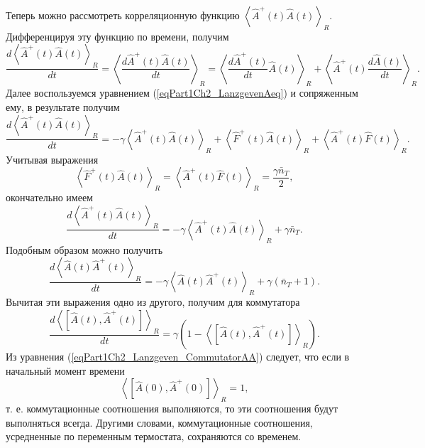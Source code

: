 Теперь можно рассмотреть корреляционную функцию 
\(
\left<\hat{A}^{+}\left(t\right)\hat{A}\left(t\right)\right>_R
\). Дифференцируя эту функцию по времени, получим
\begin{equation}
\frac{d \left<\hat{A}^{+}\left(t\right)\hat{A}\left(t\right)\right>_R}{d
t}=
\left<\frac{d \hat{A}^{+}\left(t\right)\hat{A}\left(t\right)}{d
t}\right>_R =
\left<\frac{d \hat{A}^{+}\left(t\right)}{d
t} \hat{A}\left(t\right) \right>_R + 
\left<\hat{A}^{+}\left(t\right)\frac{d \hat{A}\left(t\right)}{d
t}  \right>_R.
\label{eqPart1Ch2_Lanzgeven_dAA}
\end{equation}
Далее воспользуемся уравнением (\ref{eqPart1Ch2_LanzgevenAeq}) и
сопряженным ему, в результате получим
\begin{equation}
\frac{d \left<\hat{A}^{+}\left(t\right)\hat{A}\left(t\right)\right>_R}{d
t}=
- \gamma \left<\hat{A}^{+}\left(t\right)\hat{A}\left(t\right)\right>_R
+ \left<\hat{F}^{+}\left(t\right)\hat{A}\left(t\right)\right>_R + 
\left<\hat{A}^{+}\left(t\right)\hat{F}\left(t\right)\right>_R.
\nonumber
\end{equation}
Учитывая выражения 
\begin{equation}
\left<\hat{F}^{+}\left(t\right)\hat{A}\left(t\right)\right>_R =
\left<\hat{A}^{+}\left(t\right)\hat{F}\left(t\right)\right>_R = 
\frac{\gamma \bar{n}_T}{2},
\nonumber
\end{equation}
окончательно имеем
\begin{equation}
\frac{d \left<\hat{A}^{+}\left(t\right)\hat{A}\left(t\right)\right>_R}{d
t}=
- \gamma \left<\hat{A}^{+}\left(t\right)\hat{A}\left(t\right)\right>_R
+ \gamma \bar{n}_T.
\nonumber
\end{equation}
Подобным образом можно получить
\begin{equation}
\frac{d \left<\hat{A}\left(t\right)\hat{A}^{+}\left(t\right)\right>_R}{d
t}=
- \gamma \left<\hat{A}\left(t\right)\hat{A}^{+}\left(t\right)\right>_R
+ \gamma \left(\bar{n}_T + 1\right).
\label{eqPart1Ch2_Lanzgeven_Task3}
\end{equation}
Вычитая эти выражения одно из другого, получим для коммутатора
\begin{equation}
\frac{d \left<\left[\hat{A}\left(t\right),\hat{A}^{+}\left(t\right)\right]\right>_R}{d
t}=
\gamma \left( 1 - \left<\left[\hat{A}\left(t\right),\hat{A}^{+}\left(t\right)\right]\right>_R
\right).
\label{eqPart1Ch2_Lanzgeven_CommutatorAA}
\end{equation}
Из уравнения (\ref{eqPart1Ch2_Lanzgeven_CommutatorAA}) следует, что
если в начальный момент времени 
\[
\left<\left[\hat{A}\left(0\right),\hat{A}^{+}\left(0\right)\right]\right>_R
= 1,
\]
т. е. коммутационные соотношения выполняются, то эти соотношения будут
выполняться всегда. Другими словами, коммутационные соотношения,
усредненные по переменным термостата, сохраняются со временем. 

